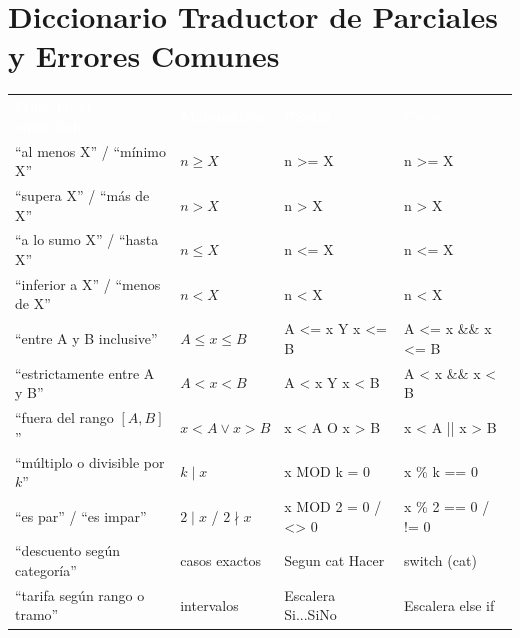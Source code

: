 \documentclass[11pt,letterpaper]{article}
\begin{document}
\newpage
\section{Diccionario Traductor de Parciales y Errores Comunes}

\begin{center}
  \small
  \renewcommand{\arraystretch}{1.28}
  \begin{tabularx}{\linewidth}{>{\raggedright\arraybackslash}p{4.6cm} >{\centering\arraybackslash}p{2.2cm} >{\ttfamily\footnotesize\raggedright\arraybackslash}p{3.6cm} >{\ttfamily\footnotesize\raggedright\arraybackslash}X}
    \rowcolor{AzulMarino}
    \textcolor{white}{\textbf{Frase en el enunciado}} &
    \textcolor{white}{\textbf{Matemática}} &
    \textcolor{white}{\textbf{\sffamily PSeInt}} &
    \textcolor{white}{\textbf{\sffamily C++}} \\
    ``al menos X'' / ``mínimo X'' & $n \ge X$ & n >= X & n >= X \\
    ``supera X'' / ``más de X'' & $n > X$ & n > X & n > X \\
    ``a lo sumo X'' / ``hasta X'' & $n \le X$ & n <= X & n <= X \\
    ``inferior a X'' / ``menos de X'' & $n < X$ & n < X & n < X \\
    ``entre A y B inclusive'' & $A \le x \le B$ & A <= x Y x <= B & A <= x \&\& x <= B \\
    ``estrictamente entre A y B'' & $A < x < B$ & A < x Y x < B & A < x \&\& x < B \\
    ``fuera del rango $[A, B]$'' & $x < A \lor x > B$ & x < A O x > B & x < A || x > B \\
    ``múltiplo o divisible por $k$'' & $k \mid x$ & x MOD k = 0 & x \% k == 0 \\
    ``es par'' / ``es impar'' & $2 \mid x$ / $2 \nmid x$ & x MOD 2 = 0 / <> 0 & x \% 2 == 0 / != 0 \\
    ``descuento según categoría'' & casos exactos & Segun cat Hacer & switch (cat) \\
    ``tarifa según rango o tramo'' & intervalos & Escalera Si...SiNo & Escalera else if \\
    \bottomrule
  \end{tabularx}
\end{center}
\end{document}
